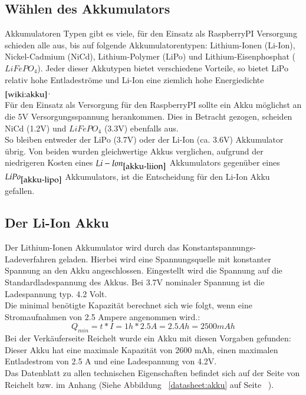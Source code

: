 \documentclass[12pt,a4paper]{article}
\begin{document}
{\subsection{Wählen des Akkumulators}
\label{SUBSEC:CHOOSE-AKKU}

Akkumulatoren Typen gibt es viele, für den Einsatz als RaspberryPI Versorgung schieden alle aus, bis auf folgende Akkumulatorentypen: Lithium-Ionen (Li-Ion), Nickel-Cadmium (NiCd),  Lithium-Polymer (LiPo) und Lithium-Eisenphosphat ($LiFePO_4$). Jeder dieser Akkutypen bietet verschiedene Vorteile, so bietet LiPo relativ hohe Entladeströme und Li-Ion eine ziemlich hohe Energiedichte $_{\cite{wiki:akku}}$. \\
Für den Einsatz als Versorgung für den RaspberryPI sollte ein Akku möglichst an die 5V Versorgungsspannung herankommen. Dies in Betracht gezogen, scheiden NiCd (1.2V) und $LiFePO_4$ (3.3V) ebenfalls aus. \\
So bleiben entweder der LiPo (3.7V) oder der Li-Ion (ca. 3.6V) Akkumulator übrig. Von beiden wurden gleichwertige Akkus verglichen, aufgrund der niedrigeren Kosten eines $Li-Ion_{\cite{akku-liion}}$ Akkumulators gegenüber eines $LiPo_{\cite{akku-lipo}}$ Akkumulators, ist die Entscheidung für den Li-Ion Akku gefallen.

\subsection{Der Li-Ion Akku}
\label{SUBSEC:LIION}

Der Lithium-Ionen Akkumulator wird durch das Konstantspannungs-Ladeverfahren geladen. Hierbei wird eine Spannungsquelle mit konstanter Spannung an den Akku angeschlossen. Eingestellt wird die Spannung auf die Standardladespannung des Akkus. Bei 3.7V nominaler Spannung ist die Ladespannung typ. 4.2 Volt. \\
Die minimal benötigte Kapazität berechnet sich wie folgt, wenn eine Stromaufnahmen von 2.5 Ampere angenommen wird.:
\[Q_{min} = t*I = 1h * 2.5A = 2.5 Ah = 2500 mAh\]
Bei der Verkäuferseite Reichelt wurde ein Akku mit diesen Vorgaben gefunden: \cite{akku-liion}\\
Dieser Akku hat eine maximale Kapazität von 2600 mAh, einen maximalen Entladestrom von 2.5 A und eine Ladespannung von 4.2V. \\[1ex]
Das Datenblatt zu allen technischen Eigenschaften befindet sich auf der Seite von Reichelt \cite{akku-liion} bzw. im Anhang (Siehe Abbildung ~\ref{datasheet:akku} auf Seite ~\pageref{datasheet:akku}).

}
\end{document}
